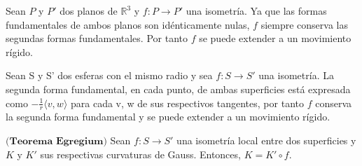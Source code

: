 \begin{ejemplo}
		Sean $P$ y $P'$ dos planos de $\mathbb{R}^3$ y $f : P \to P'$ una isometría. Ya que las formas fundamentales de ambos planos son idénticamente nulas, $f$ siempre conserva las segundas formas fundamentales. Por tanto $f$ se puede extender a un movimiento rígido.
\end{ejemplo}

\begin{ejemplo}
	Sean S y S' dos esferas con el mismo radio y sea $f : S \to S'$ una isometría. La segunda forma fundamental, en cada punto, de ambas superficies está expresada como $-\frac{1}{r} \langle v,w \rangle$ para cada v, w de sus respectivos tangentes, por tanto $f$ conserva la segunda forma fundamental y se puede extender a un movimiento rígido.
\end{ejemplo}

\begin{teorema}
	$\textbf{(Teorema Egregium)}$ Sean $f : S \to S'$ una isometría local entre dos superficies y $K$ y $K'$ sus respectivas curvaturas de Gauss. Entonces, $K = K'\circ f$.
\end{teorema}

